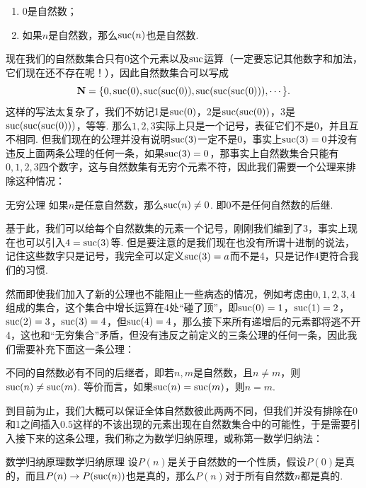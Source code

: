 \begin{axiom}{}{}
    \begin{enumerate}
        \item 0是自然数；

        \item 如果$n$是自然数，那么$\operatorname{suc}(n)$也是自然数.
    \end{enumerate}
\end{axiom}

现在我们的自然数集合只有0这个元素以及$\operatorname{suc}$运算（一定要忘记其他数字和加法，它们现在还不存在呢！），因此自然数集合可以写成
\[\mathbf{N}=\{0,\operatorname{suc}(0),\operatorname{suc}(\operatorname{suc}(0)),\operatorname{suc}(\operatorname{suc}(\operatorname{suc}(0))),\cdots\}.\]
这样的写法太复杂了，我们不妨记1是$\operatorname{suc}(0)$，2是$\operatorname{suc}(\operatorname{suc}(0))$，3是$\operatorname{suc}(\operatorname{suc}(\operatorname{suc}(0)))$，等等. 那么$1,2,3$实际上只是一个记号，表征它们不是0，并且互不相同. 但我们现在的公理并没有说明$\operatorname{suc}(3)$一定不是0，事实上$\operatorname{suc}(3)=0$并没有违反上面两条公理的任何一条，如果$\operatorname{suc}(3)=0$，那事实上自然数集合只能有$0,1,2,3$四个数字，这与自然数集有无穷个元素不符，因此我们需要一个公理来排除这种情况：

\begin{axiom}{无穷公理}{}
    如果$n$是任意自然数，那么$\operatorname{suc}(n)\neq 0$. 即0不是任何自然数的后继.
\end{axiom}

基于此，我们可以给每个自然数集的元素一个记号，刚刚我们编到了3，事实上现在也可以引入$4=\operatorname{suc}(3)$等. 但是要注意的是我们现在也没有所谓十进制的说法，记住这些数字只是记号，我完全可以定义$\operatorname{suc}(3)=a$而不是4，只是记作4更符合我们的习惯.

然而即使我们加入了新的公理也不能阻止一些病态的情况，例如考虑由$0,1,2,3,4$组成的集合，这个集合中增长运算在4处``碰了顶''，即$\operatorname{suc}(0)=1$，$\operatorname{suc}(1)=2$，$\operatorname{suc}(2)=3$，$\operatorname{suc}(3)=4$，但$\operatorname{suc}(4)=4$，那么接下来所有递增后的元素都将逃不开4，这也和``无穷集合''矛盾，但没有违反之前定义的三条公理的任何一条，因此我们需要补充下面这一条公理：

\begin{axiom}{}{}
    不同的自然数必有不同的后继者，即若$n,m$是自然数，且$n\neq m$，则$\operatorname{suc}(n)\neq \operatorname{suc}(m)$. 等价而言，如果$\operatorname{suc}(n)=\operatorname{suc}(m)$，则$n=m$.
\end{axiom}

到目前为止，我们大概可以保证全体自然数彼此两两不同，但我们并没有排除在0和1之间插入$0.5$这样的不该出现的元素出现在自然数集合中的可能性，于是需要引入接下来的这条公理，我们称之为数学归纳原理，或称第一数学归纳法：

\begin{axiom}{数学归纳原理}{数学归纳原理}
    设$P(n)$是关于自然数的一个性质，假设$P(0)$是真的，而且$P(n) \rightarrow P(\operatorname{suc}(n))$也是真的，那么$P(n)$对于所有自然数$n$都是真的.
\end{axiom}

